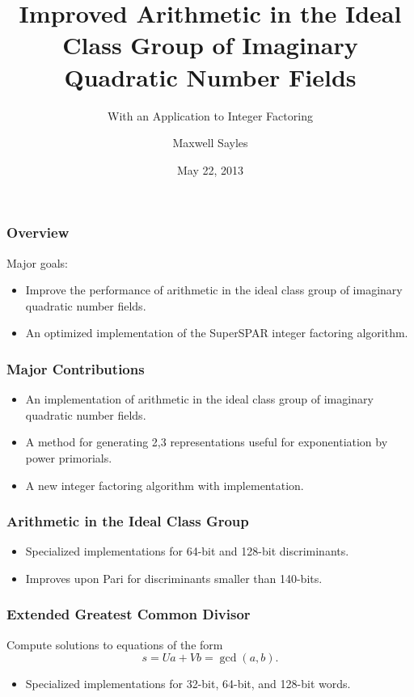 \documentclass{beamer}
\title[Ideal Class Group]{Improved Arithmetic in the Ideal Class Group of Imaginary Quadratic Number Fields}
\subtitle{With an Application to Integer Factoring}
\author{Maxwell Sayles}
\date{May 22, 2013}
\institute{
	\bigskip 
       Department of Computer Science \\
       University of Calgary
}
\begin{document}
\maketitle

\begin{frame}
\frametitle{Overview}

Major goals:
\begin{itemize}
\item Improve the performance of arithmetic in the ideal class group of imaginary quadratic number fields.
\item An optimized implementation of the SuperSPAR integer factoring algorithm.
\end{itemize}

\end{frame}

\begin{frame}
\frametitle{Major Contributions}
\begin{itemize} %
\item An implementation of arithmetic in the ideal class group of imaginary quadratic number fields.
\item A method for generating 2,3 representations useful for exponentiation by power primorials.
\item A new integer factoring algorithm with implementation.
\end{itemize}
\end{frame}
  
\begin{frame}
\frametitle{Arithmetic in the Ideal Class Group}
\begin{itemize}
\item Specialized implementations for 64-bit and 128-bit discriminants.
\item Improves upon Pari for discriminants smaller than 140-bits.
\end{itemize}
\end{frame}  
  
\begin{frame}
\frametitle{Extended Greatest Common Divisor}
Compute solutions to equations of the form
\[
	s = Ua + Vb = \gcd(a, b).
\]

\begin{itemize}
\item Specialized implementations for 32-bit, 64-bit, and 128-bit words.
\end{itemize}

\end{frame}
\end{document}
